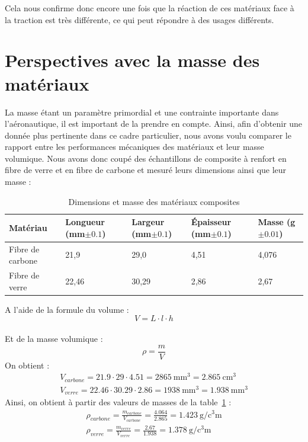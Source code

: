 Cela nous confirme donc encore une fois que la réaction de ces matériaux face à la traction est très différente, ce qui peut répondre à des usages différents.


\section{Perspectives avec la masse des matériaux}
La masse étant un paramètre primordial et une contrainte importante dans l'aéronautique, il est important de la prendre en compte.
Ainsi, afin d'obtenir une donnée plus pertinente dans ce cadre particulier, nous avons voulu comparer le rapport entre les performances mécaniques des matériaux et leur masse volumique.
Nous avons donc coupé des échantillons de composite à renfort en fibre de verre et en fibre de carbone et mesuré leurs dimensions ainsi que leur masse :
\begin{table}[h!]
    \centering
    \renewcommand{\arraystretch}{1.5}
    \begin{tabular}{|p{2cm}|p{3cm}|p{3cm}|p{3cm}|p{2cm}|}
        \hline
        \textbf{Matériau} & \textbf{Longueur (mm$\pm 0.1$)} & \textbf{Largeur (mm$\pm 0.1$)} & \textbf{Épaisseur (mm$\pm 0.1$)} & \textbf{Masse (g$\pm 0.01$)} \\ \hline
        Fibre de carbone  & 21,9                            & 29,0                           & 4,51                             & 4,076                        \\ \hline
        Fibre de verre    & 22,46                           & 30,29                          & 2,86                             & 2,67                         \\ \hline
    \end{tabular}
    \caption{Dimensions et masse des matériaux composites}
    \label{tab:dimensions_masse}
\end{table}

\noindent
A l'aide de la formule du volume : \[ V=L\cdot l\cdot h \] \\
Et de la masse volumique : \[\rho = \frac{m}{V}\]
On obtient :
\begin{gather*}
    V_{carbone} = 21.9\cdot 29\cdot 4.51 =  \qty{2865}{\milli\meter\cubed} = \qty{2.865}{\centi\meter\cubed} \\[5pt]
    V_{verre} = 22.46\cdot 30.29 \cdot 2.86 =  \qty{1938}{\milli\meter\cubed} =  \qty{1.938}{\milli\meter\cubed}
\end{gather*}
\vspace{5pt}
Ainsi, on obtient à partir des valeurs de masses de la table~\ref{tab:dimensions_masse} :
\begin{gather*}
    \rho_{carbone} = \frac {m_{carbone}} {V_{carbone}} = \frac {4.064}{2.865} =  \qty{1.423}{\gram\per\cubic\centi\meter}\\[10pt]
    \rho_{verre} = \frac {m_{verre}} {V_{verre}} = \frac {2.67}{1.938} = \qty{1.378 }{\gram\per\cubic\centi\meter}
\end{gather*}
\vspace{5pt}

